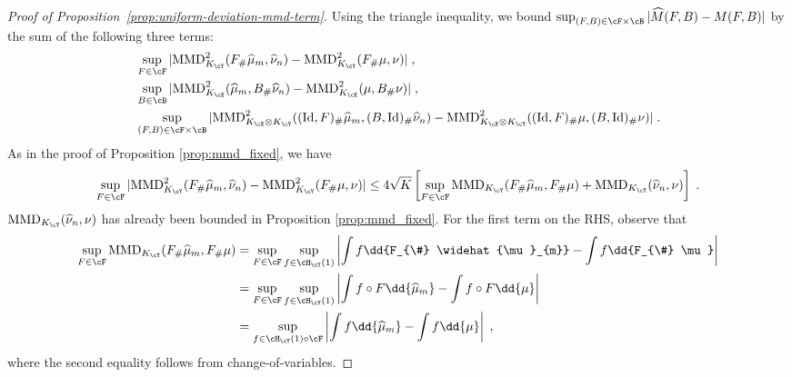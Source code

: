 \documentclass[11pt]{article}
\begin{document}
\begin{proof}[Proof of Proposition~\ref{prop:uniform-deviation-mmd-term}]
	Using the triangle inequality, we bound $\sup_{(F,B) \in \cF \times \cB} |\widehat{M}(F, B) - M(F, B)|$ by the sum of the following three terms:
	\begin{align*}
		& \sup_{F \in \cF} |\mathrm{MMD}^2_{K_{\cY}}(F_{\#}\widehat{\mu}_m, \widehat{\nu}_n) - \mathrm{MMD}^2_{K_{\cY}}(F_{\#}\mu, \nu)| \;, \\
		& \sup_{B \in \cB} |\mathrm{MMD}^2_{K_{\cX}}(\widehat{\mu}_m, B_{\#}\widehat{\nu}_n) - \mathrm{MMD}^2_{K_{\cX}}(\mu, B_{\#} \nu)| \;, \\
		& \sup_{(F,B) \in \cF \times \cB} |\mathrm{MMD}^2_{K_{\cX} \otimes K_{\cY}} ((\mathrm{Id}, F)_{\#}\widehat{\mu}_m, (B, \mathrm{Id})_{\#} \widehat{\nu}_n) - \mathrm{MMD}^2_{K_{\cX} \otimes K_{\cY}} ((\mathrm{Id}, F)_{\#}\mu, (B, \mathrm{Id})_{\#} \nu)| \;.
	\end{align*}
	As in the proof of Proposition \ref{prop:mmd_fixed}, we have
	\begin{equation*}
		\sup_{F \in \cF} |\mathrm{MMD}^2_{K_{\cY}}(F_{\#}\widehat{\mu}_m, \widehat{\nu}_n) - \mathrm{MMD}^2_{K_{\cY}}(F_{\#}\mu, \nu)|
		\le 
		4 \sqrt{K} \left[\sup_{F \in \cF} \mathrm{MMD}_{K_{\cY}}(F_{\#}\widehat{\mu}_{m}, F_{\#}\mu)  + \mathrm{MMD}_{K_{\cY}}(\widehat{\nu}_n, \nu) \right] \;.
	\end{equation*}
	$\mathrm{MMD}_{K_{\cY}}(\widehat{\nu}_n, \nu)$ has already been bounded in Proposition \ref{prop:mmd_fixed}. For the first term on the RHS, observe that
	\begin{equation*}
		\begin{split}
			\sup_{F \in \cF} \mathrm{MMD}_{K_{\cY}}(F_{\#}\widehat{\mu}_{m}, F_{\#}\mu)
			& = \sup_{F \in \cF} \sup_{f \in \cH_{\cY}(1)} \left|\int f \dd{F_{\#} \widehat{\mu}_{m}} - \int f \dd{F_{\#} \mu} \right| \\
			& = \sup_{F \in \cF} \sup_{f \in \cH_{\cY}(1)} \left|\int f \circ F \dd{\widehat{\mu}_{m}} - \int f \circ F \dd{\mu} \right| \\
			& = \sup_{f \in \cH_{\cY}(1) \circ \cF} \left|\int f \dd{\widehat{\mu}_{m}} - \int f \dd{\mu} \right|\;,
		\end{split}
	\end{equation*}
	where the second equality follows from change-of-variables.


\end{proof}
\end{document}
